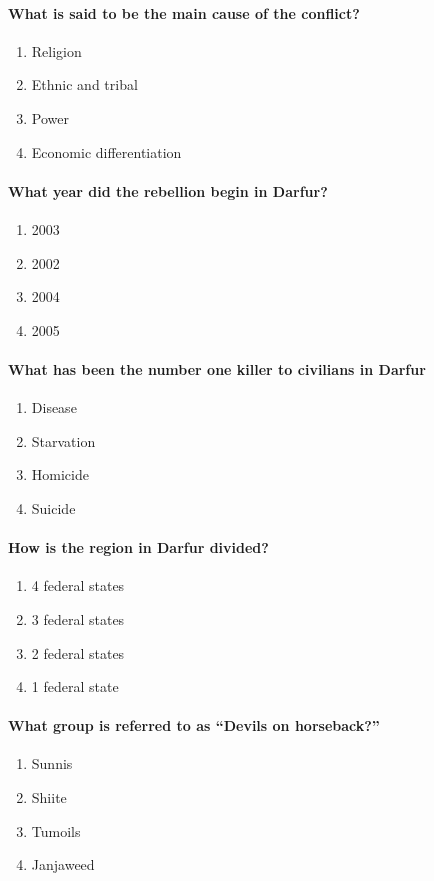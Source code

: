 		\paragraph{What is said to be the main cause of the conflict?}
			\begin{enumerate}
				\item Religion
				\item Ethnic and tribal
				\item Power
				\item Economic differentiation 
			\end{enumerate}

		\paragraph{What year did the rebellion begin in Darfur?}
			\begin{enumerate}
				\item 2003
				\item 2002
				\item 2004
				\item 2005
			\end{enumerate}

		\paragraph{What has been the number one killer to civilians in Darfur}
			\begin{enumerate}
				\item Disease
				\item Starvation
				\item Homicide
				\item Suicide
			\end{enumerate}

		\paragraph{How is the region in Darfur divided?}
			\begin{enumerate}
				\item 4 federal states
				\item 3 federal states
				\item 2 federal states
				\item 1 federal state
			\end{enumerate}

		\paragraph{What group is referred to as “Devils on horseback?”}
			\begin{enumerate}
				\item Sunnis
				\item Shiite
				\item Tumoils
				\item Janjaweed
			\end{enumerate}

